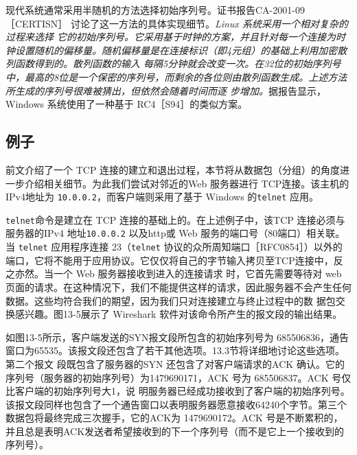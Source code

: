 现代系统通常采用半随机的方法选择初始序列号。证书报告CA-2001-09 ［CERTISN］ 讨论了这一方法的具体实现细节。\emph{\color{red}Linux 系统采用一个相对复杂的过程来选择
它的初始序列号\footnotemark。它采用基于时钟的方案，并且针对每一个连接为时钟设置随机的偏移量。随机偏移量是在连接标识（即4元组）的基础上利用加密散列函数得到的。散列函数的输入
每隔5分钟就会改变一次。在32位的初始序列号中，最高的8位是一个保密的序列号，而剩余的各位则由散列函数生成。上述方法所生成的序列号很难被猜出，但依然会随着时间而逐
步增加。}据报告显示，Windows 系统使用了一种基于 RC4［S94］的类似方案。
\subsection{例子}
前文介绍了一个 TCP 连接的建立和退出过程，本节将从数据包（分组）的角度进一步介绍相关细节。为此我们尝试对邻近的Web 服务器进行 TCP连接。该主机的IPv4地址为
\verb|10.0.0.2|，而客户端则采用了基于 Windows 的\verb|telnet| 应用。

\verb|telnet|命令是建立在 TCP 连接的基础上的。在上述例子中，该TCP 连接必须与服务器的IPv4 地址\verb|10.0.0.2| 以及http或 Web 服务的端口号（80端口）相关联。当 \verb|telnet| 应用程序连接
23（\verb|telnet| 协议的众所周知端口［RFC0854］）以外的端口，它将不能用于应用协议。它仅仅将自己的字节输入拷贝至TCP连接中，反之亦然。当一个 Web 服务器接收到进入的连接请求
时，它首先需要等待对 web 页面的请求。在这种情况下，我们不能提供这样的请求，因此服务器不会产生任何数据。这些均符合我们的期望，因为我们只对连接建立与终止过程中的数
据包交换感兴趣。图13-5展示了 Wireshark 软件对该命令所产生的报文段的输出结果。

如图13-5所示，客户端发送的SYN报文段所包含的初始序列号为 685506836，通告窗口为65535。该报文段还包含了若干其他选项。13.3节将详细地讨论这些选项。第二个报文
段既包含了服务器的SYN 还包含了对客户端请求的ACK 确认。它的序列号（服务器的初始序列号）为1479690171，ACK 号为 685506837。ACK 号仅比客户端的初始序列号大1，说
明服务器已经成功接收到了客户端的初始序列号。该报文段同样也包含了一个通告窗口以表明服务器愿意接收64240个字节。第三个数据包将最终完成三次握手，它的ACK为
1479690172。ACK 号是不断累积的，并且总是表明ACK发送者希望接收到的下一个序列号（而不是它上一个接收到的序列号）。

